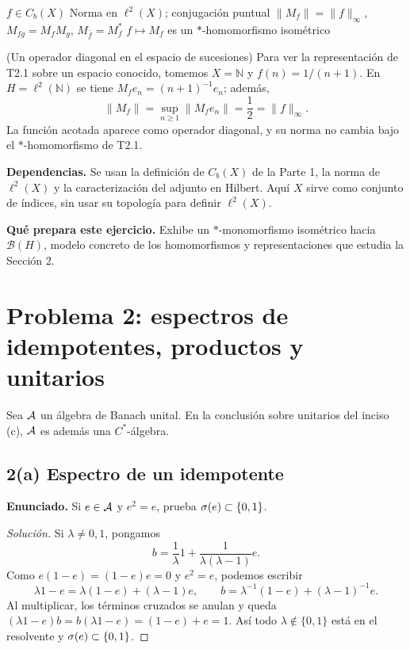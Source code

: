 \proofdiagram
{$f\in C_b(X)$}
{Norma en $\ell^2(X)$; conjugación puntual}
{$\|M_f\|=\|f\|_\infty$, $M_{fg}=M_fM_g$, $M_{\bar f}=M_f^*$}
{$f\mapsto M_f$ es un $*$-homomorfismo isométrico}

\begin{cthejemplo}{(Un operador diagonal en el espacio de sucesiones)}
Para ver la representación de T2.1 sobre un espacio conocido, tomemos $X=\mathbb N$ y
$f(n)=1/(n+1)$.
En $H=\ell^2(\mathbb N)$ se tiene $M_fe_n=(n+1)^{-1}e_n$; además,
\[
 \|M_f\|=\sup_{n\ge1}\|M_fe_n\|=\frac12=\|f\|_\infty.
\]
La función acotada aparece como operador diagonal, y su norma no cambia bajo el
$*$-homomorfismo de T2.1.
\end{cthejemplo}

\noindent\textbf{Dependencias.} Se usan la definición de $C_b(X)$ de la Parte 1, la norma de $\ell^2(X)$ y la caracterización del adjunto en Hilbert. Aquí $X$ sirve como conjunto de índices, sin usar su topología para definir $\ell^2(X)$.

\noindent\textbf{Qué prepara este ejercicio.} Exhibe un $*$-monomorfismo isométrico hacia $\mathcal B(H)$, modelo concreto de los homomorfismos y representaciones que estudia la Sección 2.

\section{Problema 2: espectros de idempotentes, productos y unitarios}

Sea $\mathcal A$ un álgebra de Banach unital. En la conclusión sobre unitarios del inciso (c), $\mathcal A$
es además una $C^*$-álgebra.

\subsection*{2(a) Espectro de un idempotente}

\noindent\textbf{Enunciado.} Si $e\in\mathcal A$ y $e^2=e$, prueba $\sigma(e)\subset\{0,1\}$.

\begin{proof}[Solución]
Si $\lambda\neq0,1$, pongamos
\[
 b=\frac1\lambda 1+\frac{1}{\lambda(\lambda-1)}e.
\]
Como $e(1-e)=(1-e)e=0$ y $e^2=e$, podemos escribir
\[
 \lambda1-e=\lambda(1-e)+(\lambda-1)e,
 \qquad b=\lambda^{-1}(1-e)+(\lambda-1)^{-1}e.
\]
Al multiplicar, los términos cruzados se anulan y queda
$(\lambda1-e)b=b(\lambda1-e)=(1-e)+e=1$. Así todo
$\lambda\notin\{0,1\}$ está en el resolvente y
$\sigma(e)\subset\{0,1\}$.
\end{proof}

